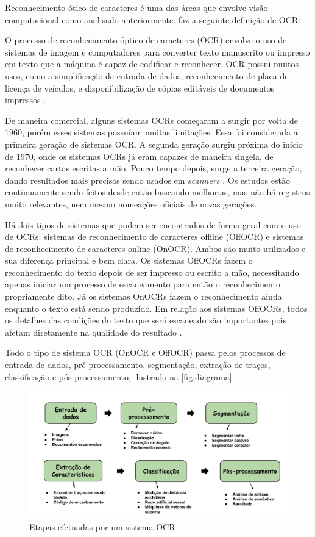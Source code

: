 Reconhecimento ótico de caracteres é uma das áreas que envolve visão computacional como analisado anteriormente.  faz a seguinte definição de OCR:
\begin{citacao}	
O processo de reconhecimento óptico de caracteres (OCR) envolve o uso de sistemas de imagem e computadores para converter texto manuscrito ou impresso em texto que a máquina é capaz de codificar e reconhecer. OCR possui muitos usos, como a simplificação de entrada de dados, reconhecimento de placa de licença de veículos, e disponibilização de cópias editáveis de documentos impressos \cite{ocr}.
\end{citacao}
De maneira comercial, alguns sistemas OCRs começaram a surgir por volta de 1960, porém esses sistemas possuíam muitas limitações. Essa foi considerada a primeira geração de sistemas OCR. A segunda geração surgiu próxima do início de 1970, onde os sistemas OCRs já eram capazes de maneira singela, de reconhecer cartas escritas a mão. Pouco tempo depois, surge a terceira geração, dando resultados mais precisos sendo usados em \textit{scanners} \cite{eikvil1993optical}. Os estudos estão continuamente sendo feitos desde então buscando melhorias, mas não há registros muito relevantes, nem mesmo nomeações oficiais de novas gerações. 

Há dois tipos de sistemas que podem ser encontrados de forma geral com o uso de OCRs: sistemas de reconhecimento de caracteres offline (OffOCR) e sistemas de reconhecimento de caracteres online (OnOCR). Ambos são muito utilizados e sua diferença principal é bem clara. Os sistemas OffOCRs fazem o reconhecimento do texto depois de ser impresso ou escrito a mão, necessitando apenas iniciar um processo de escaneamento para então o reconhecimento propriamente dito. Já os sistemas OnOCRs fazem o reconhecimento ainda enquanto o texto está sendo produzido. Em relação aos sistemas OffOCRs, todos os detalhes das condições do texto que será escaneado são importantes pois afetam diretamente na qualidade do resultado \cite{shah2013literature}.

Todo o tipo de sistema OCR (OnOCR e OffOCR) passa pelos processos de entrada de dados, pré-processamento, segmentação, extração de traços, classificação e pós processamento, ilustrado na \autoref{fig:diagrama}.

\begin{figure}[htbp]
\caption{\label{fig:diagrama}Etapas efetuadas por um sistema OCR}
\begin{center}
\includegraphics[width=.9\textwidth]{figuras/f3c2.png}
\end{center}
\end{figure}

